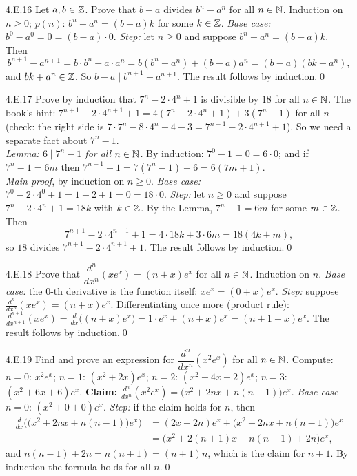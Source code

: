 \begin{bookex}[essential]{4.E.16}
Let $a,b\in\mathbb{Z}$. Prove that $b-a$ divides $b^n-a^n$ for all $n\in\mathbb{N}$.
\solution
Induction on $n\ge0$; $p(n)$: $b^n-a^n=(b-a)k$ for some $k\in\mathbb{Z}$. \emph{Base case:} $b^0-a^0=0=(b-a)\cdot0$. \emph{Step:} let $n\ge0$ and suppose $b^n-a^n=(b-a)k$. Then
\[
b^{n+1}-a^{n+1}=b\cdot b^n-a\cdot a^n=b(b^n-a^n)+(b-a)a^n=(b-a)(bk+a^n),
\]
and $bk+a^n\in\mathbb{Z}$. So $b-a\mid b^{n+1}-a^{n+1}$. The result follows by induction.\qed
\end{bookex}

\begin{bookex}[essential]{4.E.17}
Prove by induction that $7^n-2\cdot4^n+1$ is divisible by $18$ for all $n\in\mathbb{N}$.
\solution
The book's hint: $7^{n+1}-2\cdot4^{n+1}+1=4(7^n-2\cdot4^n+1)+3(7^n-1)$ for all $n$ (check: the right side is $7\cdot7^n-8\cdot4^n+4-3=7^{n+1}-2\cdot4^{n+1}+1$). So we need a separate fact about $7^n-1$.\\
\emph{Lemma: $6\mid7^n-1$ for all $n\in\mathbb{N}$.} By induction: $7^0-1=0=6\cdot0$; and if $7^n-1=6m$ then $7^{n+1}-1=7(7^n-1)+6=6(7m+1)$.\\
\emph{Main proof}, by induction on $n\ge0$. \emph{Base case:} $7^0-2\cdot4^0+1=1-2+1=0=18\cdot0$. \emph{Step:} let $n\ge0$ and suppose $7^n-2\cdot4^n+1=18k$ with $k\in\mathbb{Z}$. By the Lemma, $7^n-1=6m$ for some $m\in\mathbb{Z}$. Then
\[
7^{n+1}-2\cdot4^{n+1}+1=4\cdot18k+3\cdot6m=18(4k+m),
\]
so $18$ divides $7^{n+1}-2\cdot4^{n+1}+1$. The result follows by induction.\qed
\end{bookex}

\begin{bookex}[essential]{4.E.18}
Prove that $\dfrac{d^n}{dx^n}(xe^x)=(n+x)e^x$ for all $n\in\mathbb{N}$.
\solution
Induction on $n$. \emph{Base case:} the $0$-th derivative is the function itself: $xe^x=(0+x)e^x$. \emph{Step:} suppose $\frac{d^n}{dx^n}(xe^x)=(n+x)e^x$. Differentiating once more (product rule): $\frac{d^{n+1}}{dx^{n+1}}(xe^x)=\frac d{dx}\big((n+x)e^x\big)=1\cdot e^x+(n+x)e^x=(n+1+x)e^x$. The result follows by induction.\qed
\end{bookex}

\begin{bookex}[essential]{4.E.19}
Find and prove an expression for $\dfrac{d^n}{dx^n}(x^2e^x)$ for all $n\in\mathbb{N}$.
\solution
Compute: $n=0$: $x^2e^x$; $n=1$: $(x^2+2x)e^x$; $n=2$: $(x^2+4x+2)e^x$; $n=3$: $(x^2+6x+6)e^x$. \textbf{Claim:} $\frac{d^n}{dx^n}(x^2e^x)=\big(x^2+2nx+n(n-1)\big)e^x$. \emph{Base case} $n=0$: $(x^2+0+0)e^x$. \emph{Step:} if the claim holds for $n$, then
\begin{align*}
\frac d{dx}\Big(\big(x^2+2nx+n(n-1)\big)e^x\Big)&=(2x+2n)e^x+\big(x^2+2nx+n(n-1)\big)e^x\\
&=\big(x^2+2(n+1)x+n(n-1)+2n\big)e^x,
\end{align*}
and $n(n-1)+2n=n(n+1)=(n+1)n$, which is the claim for $n+1$. By induction the formula holds for all $n$.\qed
\end{bookex}

